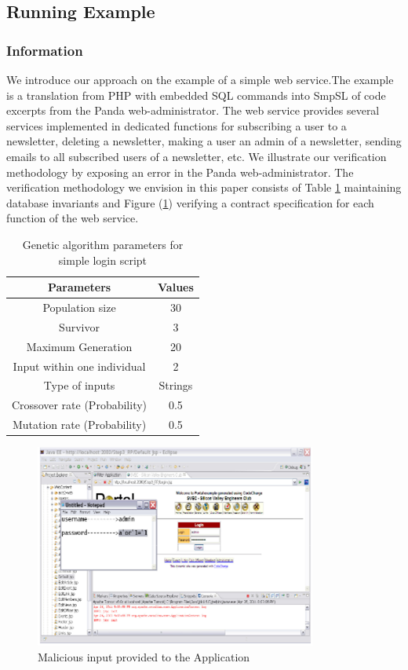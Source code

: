 \documentclass[12pt]{acmart}
\begin{document}
\subsection{Running Example}

\subsubsection{Information}

We introduce our approach on the example of a simple web service.The example is a translation from PHP with embedded SQL commands into SmpSL of code excerpts from the Panda web-administrator. The web service provides several services implemented in dedicated functions for subscribing a user to a newsletter, deleting a newsletter, making a user an admin of a newsletter, sending emails to all subscribed users of a newsletter, etc. We illustrate our verification methodology by exposing an error in the Panda web-administrator. The verification methodology we envision in this paper consists of Table \ref{tab1} maintaining database invariants and Figure (\ref{pic1}) verifying a contract specification for each function of the web service.

\begin{table}[H]
\caption{Genetic algorithm parameters for simple login script}
    \begin{tabular}{|c|c|}
        \hline
        Parameters  & Values \\
        \hline
        Population size  & 30 \\
        \hline
        Survivor & 3 \\
        \hline
        Maximum Generation & 20 \\
        \hline
        Input within one individual & 2 \\
        \hline
        Type of inputs & Strings \\
        \hline
        Crossover rate (Probability) & 0.5 \\
        \hline
        Mutation rate (Probability) & 0.5 \\
        \hline
    \end{tabular}
\label{tab1}
\end{table}

\begin{figure}[H]
    \centering
    \includegraphics{Picture1.png}
    \caption{Malicious input provided to the Application}
    \label{pic1}
\end{figure}
\end{document}
